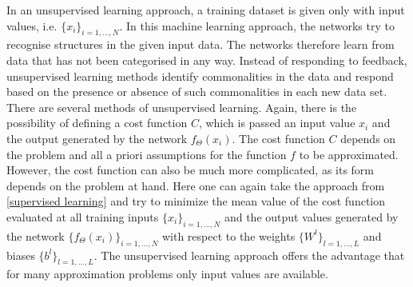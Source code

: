 In an unsupervised learning approach, a training dataset is given only with input values, i.e. $\{ x_i \}_{i = 1, \ldots, N}$. In this machine learning approach, the networks try to recognise structures in the given input data. The networks therefore learn from data that has not been categorised in any way. Instead of responding to feedback, unsupervised learning methods identify commonalities in the data and respond based on the presence or absence of such commonalities in each new data set. There are several methods of unsupervised learning. Again, there is the possibility of defining a cost function $C$, which is passed an input value $x_i$ and the output generated by the network $f_{\Theta}(x_i)$. The cost function $C$ depends on the problem and all a priori assumptions for the function $f$ to be approximated. However, the cost function can also be much more complicated, as its form depends on the problem at hand. Here one can again take the approach from \cref{supervised learning} and try to minimize the mean value of the cost function evaluated at all training inputs $\{ x_i \}_{i = 1, \ldots, N}$ and the output values generated by the network $\{ f_{\Theta}(x_i) \}_{i = 1, \ldots, N}$ with respect to the weights $\{ W^l \}_{l = 1, \ldots, L}$ and biases $\{ b^l \}_{l = 1, \ldots, L}$. The unsupervised learning approach offers the advantage that for many approximation problems only input values are available. \\

